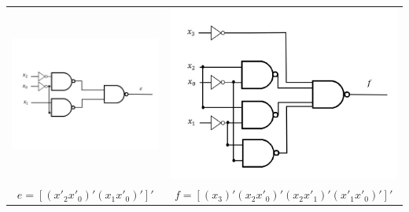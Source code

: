 \documentclass{article}
\begin{document}
\clearpage

\begin{table}[h!]
\begin{tabular}{ c c }
\centering
\includegraphics[scale=0.25]{e-NAND-NAND} &
\includegraphics[scale=0.25]{f-NAND-NAND} \\
$e = [ (x'_2 x'_0)' (x_1 x'_0)' ]'$ &
$f = [ (x_3)' (x_2 x'_0)' (x_2 x'_1)' (x'_1 x'_0)' ]'$ \\
\end{tabular}
\end{table}
\end{document}
